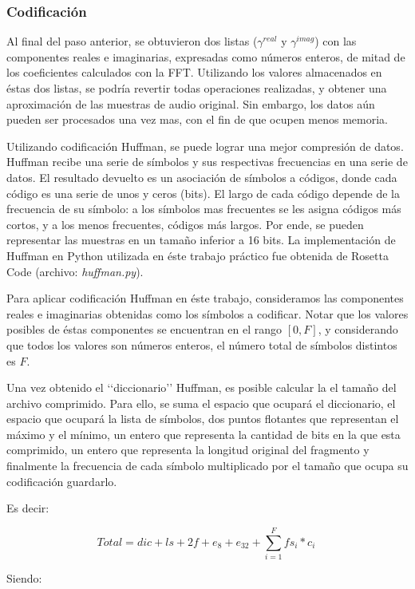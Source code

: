 \documentclass[12pt,a4paper]{article}
\begin{document}
\subsubsection{Codificación}

  Al final del paso anterior, se obtuvieron dos listas ($\gamma^{real}$ y $\gamma^{imag}$) con las componentes reales e imaginarias, expresadas como números enteros, de mitad de los coeficientes calculados con la FFT.  Utilizando los valores almacenados en éstas dos listas, se podría revertir todas operaciones realizadas, y obtener una aproximación de las muestras de audio original.  Sin embargo, los datos aún pueden ser procesados una vez mas, con el fin de que ocupen menos memoria.

  Utilizando codificación Huffman, se puede lograr una mejor compresión de datos.  Huffman recibe una serie de símbolos y sus respectivas frecuencias en una serie de datos.  El resultado devuelto es un asociación de símbolos a códigos, donde cada código es una serie de unos y ceros (bits).  El largo de cada código depende de la frecuencia de su símbolo: a los símbolos mas frecuentes se les asigna códigos más cortos, y a los menos frecuentes, códigos más largos. Por ende, se pueden representar las muestras en un tamaño inferior a 16 bits.  La implementación de Huffman en Python utilizada en éste trabajo práctico fue obtenida de Rosetta Code \cite{rosetta} (archivo: \emph{huffman.py}).

  Para aplicar codificación Huffman en éste trabajo, consideramos las componentes reales e imaginarias obtenidas como los símbolos a codificar.  Notar que los valores posibles de éstas componentes se encuentran en el rango $[0, F]$, y considerando que todos los valores son números enteros, el número total de símbolos distintos es $F$.

  Una vez obtenido el ‘‘diccionario’’ Huffman, es posible calcular la el tamaño del archivo comprimido. Para ello, se suma el espacio que ocupará el diccionario, el espacio que ocupará la lista de símbolos, dos puntos flotantes que representan el máximo y el mínimo, un entero que representa la cantidad de bits en la que esta comprimido, un entero que representa la longitud original del fragmento y finalmente la frecuencia de cada símbolo multiplicado por el tamaño que ocupa su codificación guardarlo. 
  
  Es decir:

$$ Total = dic + ls + 2f + e_8 + e_{32} + \sum_{i=1}^{F}fs_{i} * c_{i}  \ $$
  
  Siendo:
  
\end{document}
